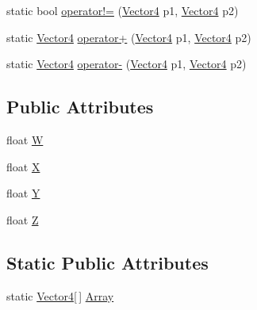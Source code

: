 \begin{DoxyCompactItemize}
\item 
static bool \hyperlink{struct_microsoft_1_1_xna_1_1_framework_1_1_vector4_ac09ec3ff772931b596a5c84eb8f3e98e}{operator!=} (\hyperlink{struct_microsoft_1_1_xna_1_1_framework_1_1_vector4}{Vector4} p1, \hyperlink{struct_microsoft_1_1_xna_1_1_framework_1_1_vector4}{Vector4} p2)
\item 
static \hyperlink{struct_microsoft_1_1_xna_1_1_framework_1_1_vector4}{Vector4} \hyperlink{struct_microsoft_1_1_xna_1_1_framework_1_1_vector4_ab6516b37f8bc3484bcba7986e6a2608b}{operator+} (\hyperlink{struct_microsoft_1_1_xna_1_1_framework_1_1_vector4}{Vector4} p1, \hyperlink{struct_microsoft_1_1_xna_1_1_framework_1_1_vector4}{Vector4} p2)
\item 
static \hyperlink{struct_microsoft_1_1_xna_1_1_framework_1_1_vector4}{Vector4} \hyperlink{struct_microsoft_1_1_xna_1_1_framework_1_1_vector4_ad8f7f376882f0b7a75b7a9ad37d0f78a}{operator-\/} (\hyperlink{struct_microsoft_1_1_xna_1_1_framework_1_1_vector4}{Vector4} p1, \hyperlink{struct_microsoft_1_1_xna_1_1_framework_1_1_vector4}{Vector4} p2)
\end{DoxyCompactItemize}
\subsection*{Public Attributes}
\begin{DoxyCompactItemize}
\item 
float \hyperlink{struct_microsoft_1_1_xna_1_1_framework_1_1_vector4_aa23de086d534ffb903f78fa282098592}{W}
\item 
float \hyperlink{struct_microsoft_1_1_xna_1_1_framework_1_1_vector4_aff5d4bc51411b5ffebfe2a6b97af4848}{X}
\item 
float \hyperlink{struct_microsoft_1_1_xna_1_1_framework_1_1_vector4_afb10f6702f279cc2a3c9d6f82d724b5a}{Y}
\item 
float \hyperlink{struct_microsoft_1_1_xna_1_1_framework_1_1_vector4_a5f85b5e979075516fd5b53ab01c635fc}{Z}
\end{DoxyCompactItemize}
\subsection*{Static Public Attributes}
\begin{DoxyCompactItemize}
\item 
static \hyperlink{struct_microsoft_1_1_xna_1_1_framework_1_1_vector4}{Vector4}\mbox{[}$\,$\mbox{]} \hyperlink{struct_microsoft_1_1_xna_1_1_framework_1_1_vector4_ac7ed4de3bed53587b605f1304c90e072}{Array}
\end{DoxyCompactItemize}
